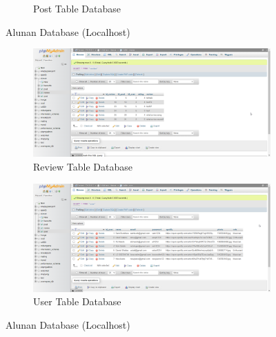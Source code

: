 \begin{enumerate}[1.]
\begin{figure}[h]
\begin{subfigure}[b]{1.0\textwidth}
            \caption{Post Table Database}
            \label{fig:sub3}
        \end{subfigure}
        \caption{Alunan Database (Localhost)}
        \label{fig:myfig73b}
    \end{figure}
    \clearpage
    \begin{figure}[h]
        \centering
        \begin{subfigure}[b]{1.0\textwidth}
            \centering
            \includegraphics[width=\textwidth]{mainmatter/images/backend/localreview.png}
            \caption{Review Table Database}
            \vspace{0.8cm}
            \label{fig:sub4}
        \end{subfigure}
        \hspace{0.08\textwidth}
        \begin{subfigure}[b]{1.0\textwidth}
            \centering
            \includegraphics[width=\textwidth]{mainmatter/images/backend/localuser.png}
            \caption{User Table Database}
            \label{fig:sub5}
        \end{subfigure}
        \caption{Alunan Database (Localhost)}
        \label{fig:myfig73c}
    \end{figure}
    \clearpage


\end{enumerate}
